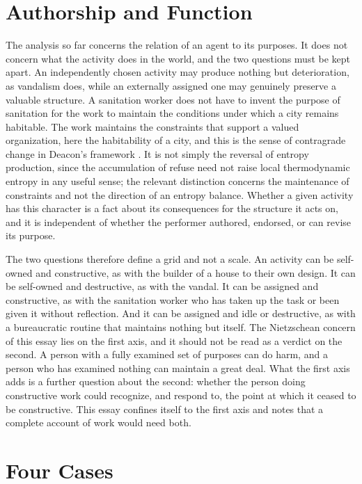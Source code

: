 \documentclass[11pt]{article}
\begin{document}
\section{Authorship and Function}

The analysis so far concerns the relation of an agent to its purposes. It does not concern what the activity does in the world, and the two questions must be kept apart. An independently chosen activity may produce nothing but deterioration, as vandalism does, while an externally assigned one may genuinely preserve a valuable structure. A sanitation worker does not have to invent the purpose of sanitation for the work to maintain the conditions under which a city remains habitable. The work maintains the constraints that support a valued organization, here the habitability of a city, and this is the sense of contragrade change in Deacon's framework \cite{deacon2012}. It is not simply the reversal of entropy production, since the accumulation of refuse need not raise local thermodynamic entropy in any useful sense; the relevant distinction concerns the maintenance of constraints and not the direction of an entropy balance. Whether a given activity has this character is a fact about its consequences for the structure it acts on, and it is independent of whether the performer authored, endorsed, or can revise its purpose.

The two questions therefore define a grid and not a scale. An activity can be self-owned and constructive, as with the builder of a house to their own design. It can be self-owned and destructive, as with the vandal. It can be assigned and constructive, as with the sanitation worker who has taken up the task or been given it without reflection. And it can be assigned and idle or destructive, as with a bureaucratic routine that maintains nothing but itself. The Nietzschean concern of this essay lies on the first axis, and it should not be read as a verdict on the second. A person with a fully examined set of purposes can do harm, and a person who has examined nothing can maintain a great deal. What the first axis adds is a further question about the second: whether the person doing constructive work could recognize, and respond to, the point at which it ceased to be constructive. This essay confines itself to the first axis and notes that a complete account of work would need both.

\section{Four Cases}
\end{document}
